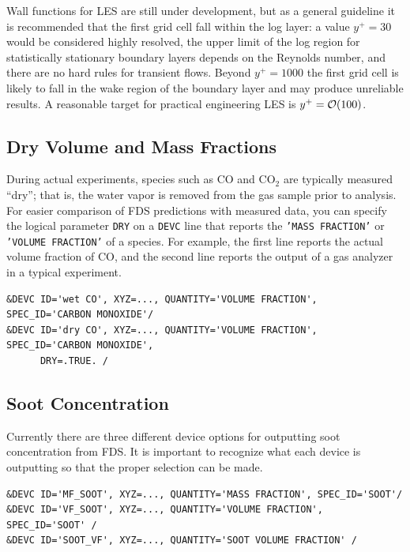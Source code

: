 \documentclass[11pt]{book}
\newcommand{\ct}{\tt\small}
\begin{document}
\noindent Wall functions for LES are still under development, but as a general guideline it is recommended that the first grid cell fall within the log layer: a value $y^+=30$ would be considered highly resolved, the upper limit of the log region for statistically stationary boundary layers depends on the Reynolds number, and there are no hard rules for transient flows.  Beyond $y^+=1000$ the first grid cell is likely to fall in the wake region of the boundary layer and may produce unreliable results.  A reasonable target for practical engineering LES is $y^+ = {\cal O}(100)$.

\subsection{Dry Volume and Mass Fractions}
\label{info:dry}

During actual experiments, species such as CO and CO$_2$ are typically measured ``dry''; that is, the water
vapor is removed from the gas sample prior to analysis.  For easier comparison of FDS predictions with measured data,
you can specify the logical parameter {\ct DRY} on a {\ct DEVC} line that reports the {\ct 'MASS FRACTION'} or
{\ct 'VOLUME FRACTION'} of a species.  For example, the first line reports
the actual volume fraction of CO, and the second line reports the output of a gas analyzer in a typical experiment.

\footnotesize
\begin{verbatim}
&DEVC ID='wet CO', XYZ=..., QUANTITY='VOLUME FRACTION', SPEC_ID='CARBON MONOXIDE'/
&DEVC ID='dry CO', XYZ=..., QUANTITY='VOLUME FRACTION', SPEC_ID='CARBON MONOXIDE',
      DRY=.TRUE. /
\end{verbatim}
\normalsize

\subsection{Soot Concentration}
\label{info:soot}

Currently there are three different device options for outputting soot concentration from FDS. It is important to recognize what each device is outputting so that the proper selection can be made.

\footnotesize
\begin{verbatim}
&DEVC ID='MF_SOOT', XYZ=..., QUANTITY='MASS FRACTION', SPEC_ID='SOOT'/
&DEVC ID='VF_SOOT', XYZ=..., QUANTITY='VOLUME FRACTION', SPEC_ID='SOOT' /
&DEVC ID='SOOT_VF', XYZ=..., QUANTITY='SOOT VOLUME FRACTION' /
\end{verbatim}
\normalsize
\end{document}
